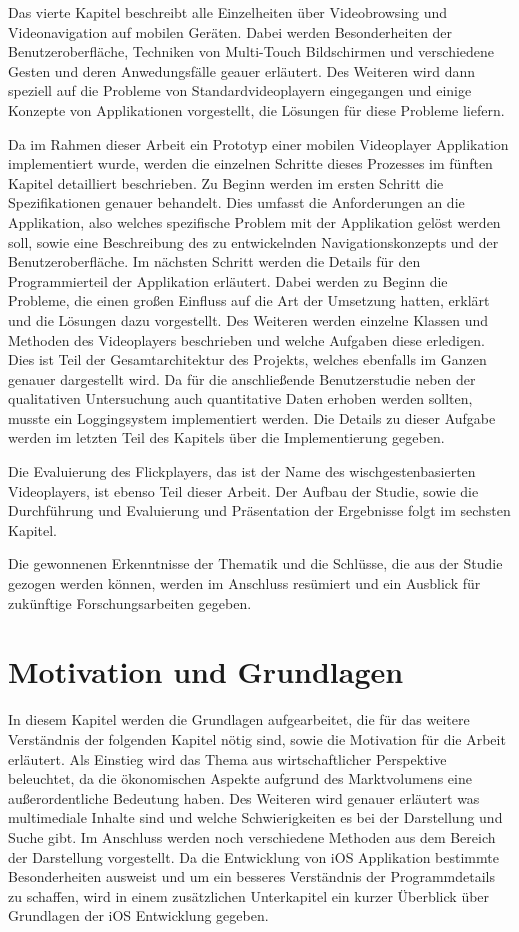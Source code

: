\documentclass[11pt,a4paper]{report}
\begin{document}
Das vierte Kapitel beschreibt alle Einzelheiten über Videobrowsing und Videonavigation auf mobilen Geräten. Dabei werden Besonderheiten der Benutzeroberfläche, Techniken von Multi-Touch Bildschirmen und verschiedene Gesten und deren Anwedungsfälle geauer erläutert. Des Weiteren wird dann speziell auf die Probleme von Standardvideoplayern eingegangen und einige Konzepte von Applikationen vorgestellt, die Lösungen für diese Probleme liefern.

Da im Rahmen dieser Arbeit ein Prototyp einer mobilen Videoplayer Applikation implementiert wurde, werden die einzelnen Schritte dieses Prozesses im fünften Kapitel detailliert beschrieben. Zu Beginn werden im ersten Schritt die Spezifikationen genauer behandelt. Dies umfasst die Anforderungen an die Applikation, also welches spezifische Problem mit der Applikation gelöst werden soll, sowie eine Beschreibung des zu entwickelnden Navigationskonzepts und der Benutzeroberfläche. Im nächsten Schritt werden die Details für den Programmierteil der Applikation erläutert. Dabei werden zu Beginn die Probleme, die einen großen Einfluss auf die Art der Umsetzung hatten, erklärt und die Lösungen dazu vorgestellt. Des Weiteren werden einzelne Klassen und Methoden des Videoplayers beschrieben und welche Aufgaben diese erledigen. Dies ist Teil der Gesamtarchitektur des Projekts, welches ebenfalls im Ganzen genauer dargestellt wird. Da für die anschließende Benutzerstudie neben der qualitativen Untersuchung auch quantitative Daten erhoben werden sollten, musste ein Loggingsystem implementiert werden. Die Details zu dieser Aufgabe werden im letzten Teil des Kapitels über die Implementierung gegeben.

Die Evaluierung des Flickplayers, das ist der Name des wischgestenbasierten Videoplayers, ist ebenso Teil dieser Arbeit. Der Aufbau der Studie, sowie die Durchführung und Evaluierung und Präsentation der Ergebnisse folgt im sechsten Kapitel.

Die gewonnenen Erkenntnisse der Thematik und die Schlüsse, die aus der Studie gezogen werden können, werden im Anschluss resümiert und ein Ausblick für zukünftige Forschungsarbeiten gegeben.

\chapter{Motivation und Grundlagen}

In diesem Kapitel werden die Grundlagen aufgearbeitet, die für das weitere Verständnis der folgenden Kapitel nötig sind, sowie die Motivation für die Arbeit erläutert. Als Einstieg wird das Thema aus wirtschaftlicher Perspektive beleuchtet, da die ökonomischen Aspekte aufgrund des Marktvolumens eine außerordentliche Bedeutung haben. Des Weiteren wird genauer erläutert was multimediale Inhalte sind und welche Schwierigkeiten es bei der Darstellung und Suche gibt. Im Anschluss werden noch verschiedene Methoden aus dem Bereich der Darstellung vorgestellt. Da die Entwicklung von iOS Applikation bestimmte Besonderheiten ausweist und um ein besseres Verständnis der Programmdetails zu schaffen, wird in einem zusätzlichen Unterkapitel ein kurzer Überblick über Grundlagen der iOS Entwicklung gegeben.
\end{document}
